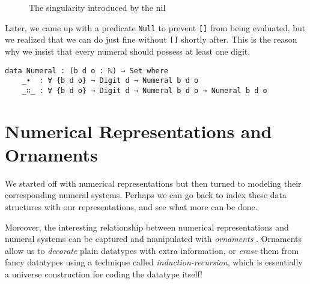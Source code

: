 \documentclass[\main/thesis.tex]{subfiles}
\begin{document}
\begin{figure}[H]
    \centering
    \begin{adjustbox}{max width=\textwidth}
    \end{adjustbox}
\caption{The singularity introduced by the nil}
\label{figure:41}
\end{figure}

Later, we came up with a predicate \lstinline|Null| to prevent \lstinline|[]|
from being evaluated, but we realized that we can do just fine without
\lstinline|[]| shortly after.
This is the reason why we insist that every numeral should possess at least one
digit.

\begin{lstlisting}
data Numeral : (b d o : ℕ) → Set where
    _∙  : ∀ {b d o} → Digit d → Numeral b d o
    _∷_ : ∀ {b d o} → Digit d → Numeral b d o → Numeral b d o
\end{lstlisting}

\section{Numerical Representations and Ornaments}

We started off with numerical representations but then turned to
modeling their corresponding numeral systems.
Perhaps we can go back to index these data structures with our representations,
and see what more can be done.

Moreover, the interesting relationship between numerical representations
and numeral systems can be captured and manipulated with \textit{ornaments}
\cite{mcbride2010ornamental}.
Ornaments allow us to \textit{decorate} plain datatypes with extra information,
or \textit{erase} them from fancy datatypes using a technique called
\textit{induction-recursion}\cite{dybjer1999finite}, which is essentially
a universe construction for coding the datatype itself!
\end{document}
